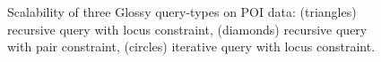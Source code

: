 \documentclass[11pt, oneside]{report}
\begin{document}
{\begin{figure}[!t]
\centering
{}
\vspace{-4ex}
\caption{Scalability of three Glossy query-types on POI data: (triangles) recursive query with locus constraint, (diamonds) recursive query with pair constraint, (circles) iterative query with locus constraint.}
\vspace{-3ex}
\label{fig:glossy:scalability}
\end{figure}


}
\end{document}
